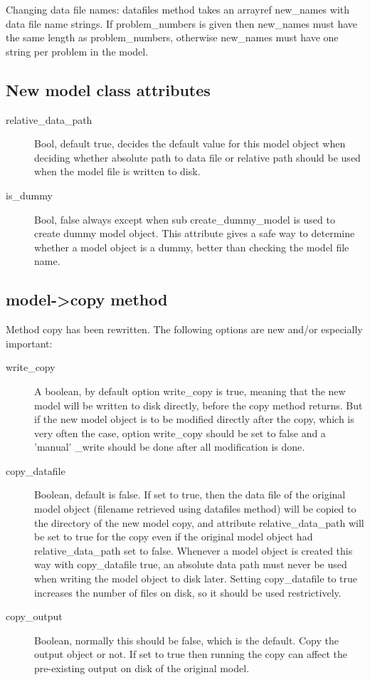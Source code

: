 Changing data file names: datafiles method takes an arrayref new\_names with data file name strings. If problem\_numbers is
given then new\_names must have the same length as problem\_numbers, otherwise new\_names must have one string
per problem in the model.

\subsection{New model class attributes}
\begin{description}
\item[relative\_data\_path] Bool, default true, decides the default value for this model object when
deciding whether absolute path to data file or relative path should be used when the model file is written to disk.
\item[is\_dummy] Bool, false always except when sub create\_dummy\_model is used to create dummy model object. This attribute
gives a safe way to determine whether a model object is a dummy, better than checking the model file name.
\end{description}

\subsection{model->copy method}
Method copy has been rewritten. The following options are new and/or especially important:
\begin{description}
\item[write\_copy] A boolean, by default option write\_copy is true, meaning that the new model will be written to disk 
directly, before the copy method returns. But if the new model object is to be modified directly after the copy,
which is very often the case, option write\_copy should be set to false and a 'manual' \_write should be done
after all modification is done.
\item[copy\_datafile] Boolean, default is false. If set to true, then the data file of the original model object (filename 
retrieved using datafiles method) will be copied to the directory of the new model copy, and attribute 
relative\_data\_path will be set to true for the copy even if the original model object had
relative\_data\_path set to false.
Whenever a model object is created this way with copy\_datafile true, an absolute data path must never
be used when writing the model object to disk later.
Setting copy\_datafile to true increases the number of files on disk, so it should be used restrictively.
\item[copy\_output] Boolean, normally this should be false, which is the default. Copy the output object or not.
If set to true then running the copy can affect the pre-existing output on disk of the original model. 
\end{description}

